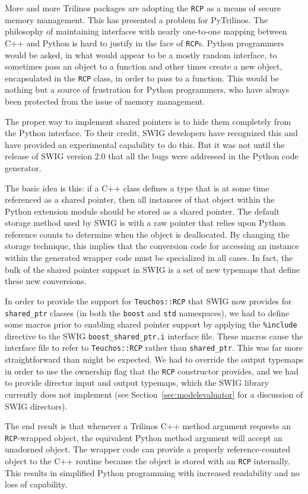\documentclass[11pt]{article}
\begin{document}
More and more Trilinos packages are adopting the {\tt RCP} as a means of secure memory management.  This has presented a problem for PyTrilinos.  The philosophy of maintaining interfaces with nearly one-to-one mapping between C++ and Python is hard to justify in the face of {\tt RCP}s.  Python programmers would be asked, in what would appear to be a mostly random interface, to sometimes pass an object to a function and other times create a new object, encapsulated in the {\tt RCP} class, in order to pass to a function.  This would be nothing but a source of frustration for Python programmers, who have always been protected from the issue of memory management.

The proper way to implement shared pointers is to hide them completely from the Python interface.  To their credit, SWIG developers have recognized this and have provided an experimental capability to do this.  But it was not until the release of SWIG version 2.0 that all the bugs were addressed in the Python code generator.

The basic idea is this: if a C++ class defines a type that is at some time referenced as a shared pointer, then all instances of that object within the Python extension module should be stored as a shared pointer.  The default storage method used by SWIG is with a raw pointer that relies upon Python reference counts to determine when the object is deallocated.  By changing the storage technique, this implies that the conversion code for accessing an instance within the generated wrapper code must be specialized in all cases.  In fact, the bulk of the shared pointer support in SWIG is a set of new typemaps that define these new conversions.

In order to provide the support for {\tt Teuchos::RCP} that SWIG now provides for {\tt shared\_ptr} classes (in both the {\tt boost} and {\tt std} namespaces), we had to define some macros prior to enabling shared pointer support by applying the {\tt \%include} directive to the SWIG {\tt boost\_shared\_ptr.i} interface file. These macros cause the interface file to refer to {\tt Teuchos::RCP} rather than {\tt shared\_ptr}.  This was far more straightforward than might be expected.  We had to override the output typemaps in order to use the ownership flag that the {\tt RCP} constructor provides, and we had to provide director input and output typemaps, which the SWIG library currently does not implement (see Section~\ref{sec:modelevaluator} for a discussion of SWIG directors).

The end result is that whenever a Trilinos C++ method argument requests an {\tt RCP}-wrapped object, the equivalent Python method argument will accept an unadorned object.  The wrapper code can provide a properly reference-counted object to the C++ routine because the object is stored with an {\tt RCP} internally.  This results in simplified Python programming with increased readability and no loss of capability.
\end{document}

